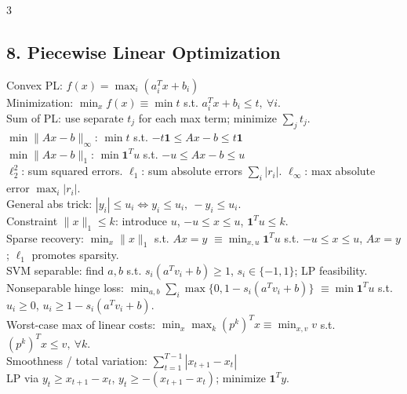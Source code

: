 \documentclass[8pt,landscape]{extarticle}
\newcommand{\norm}[1]{\|#1\|}
\newcommand{\1}{\mathbf{1}}
\newcommand{\0}{\mathbf{0}}
\begin{document}
\begin{multicols*}{3}
\subsection*{8. Piecewise Linear Optimization}
Convex PL: $f(x)=\max_i(a_i^Tx+b_i)$ \\
Minimization: $\min_x f(x)\equiv \min t$ s.t. $a_i^Tx+b_i\le t,\ \forall i$. \\
Sum of PL: use separate $t_j$ for each max term; minimize $\sum_j t_j$. \\
$\min\norm{Ax-b}_\infty$: $\min t$ s.t. $-t\1\le Ax-b\le t\1$ \\
$\min\norm{Ax-b}_1$: $\min \1^Tu$ s.t. $-u\le Ax-b\le u$ \\
$\ell_2^2$: sum squared errors. 
$\ell_1$: sum absolute errors $\sum_i |r_i|$.
$\ell_\infty$: max absolute error $\max_i |r_i|$.\\
General abs trick: $|y_i|\le u_i \iff y_i\le u_i,\ -y_i\le u_i$. \\
Constraint $\|x\|_1\le k$: introduce $u$, $-u\le x\le u$, $\mathbf1^Tu\le k$. \\
Sparse recovery: $\min_x\|x\|_1$ s.t. $Ax=y$
$\equiv \min_{x,u}\mathbf1^Tu$ s.t. $-u\le x\le u$, $Ax=y$; $\ell_1$ promotes sparsity. \\
SVM separable: find $a,b$ s.t. $s_i(a^Tv_i+b)\ge1$, $s_i\in\{-1,1\}$; LP feasibility. \\
Nonseparable hinge loss:
$\min_{a,b}\sum_i\max\{0,1-s_i(a^Tv_i+b)\}$
$\equiv \min\mathbf1^Tu$ s.t. $u_i\ge0$, $u_i\ge1-s_i(a^Tv_i+b)$.\\
Worst-case max of linear costs: $\min_x \max_k (p^k)^Tx
\equiv \min_{x,v} v$ s.t. $(p^k)^Tx\le v,\ \forall k$.\\
Smoothness / total variation: $\sum_{t=1}^{T-1}|x_{t+1}-x_t|$\\
LP via $y_t\ge x_{t+1}-x_t$, $y_t\ge -(x_{t+1}-x_t)$; minimize $\mathbf1^Ty$.



\end{multicols*}
\end{document}
